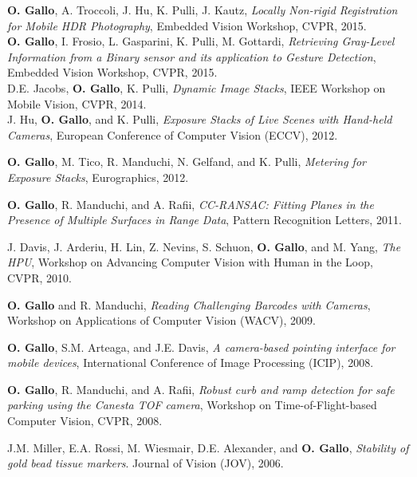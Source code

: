 \documentclass[10pt]{article}
\newcommand{\OG}{\textbf{O. Gallo}}
\begin{document}
\OG{}, A. Troccoli, J. Hu, K. Pulli, J. Kautz, \emph{Locally Non-rigid Registration for Mobile {HDR} Photography}, Embedded Vision Workshop, CVPR, 2015.\\

\OG{}, I. Frosio, L. Gasparini, K. Pulli, M. Gottardi, \emph{Retrieving Gray-Level Information from a Binary sensor and its application to Gesture Detection}, Embedded Vision Workshop, CVPR, 2015.\\

D.E. Jacobs, \OG{}, K. Pulli, \emph{Dynamic Image Stacks},  IEEE Workshop on Mobile Vision, CVPR, 2014.\\

J. Hu, \OG{}, and K. Pulli, \emph{Exposure Stacks of Live Scenes with Hand-held Cameras}, European Conference of Computer Vision (ECCV), 2012.\newline

\OG{}, M. Tico, R. Manduchi, N. Gelfand, and K. Pulli, \emph{Metering for Exposure Stacks}, Eurographics, 2012.\newline

\OG{}, R. Manduchi, and A. Rafii, \emph{CC-RANSAC: Fitting Planes in the Presence of Multiple Surfaces in Range Data}, Pattern Recognition Letters, 2011.\newline

J. Davis, J. Arderiu, H. Lin, Z. Nevins, S. Schuon, \OG{}, and M. Yang, \emph{The HPU}, Workshop on Advancing Computer Vision with Human in the Loop, CVPR, 2010.\newline

\OG{} and R. Manduchi, \emph{Reading Challenging Barcodes with Cameras}, Workshop on Applications of Computer Vision (WACV), 2009.\newline

\OG{}, S.M. Arteaga, and J.E. Davis, \emph{A camera-based pointing
interface for mobile devices}, International Conference of Image Processing (ICIP), 2008.\newline

\OG{}, R. Manduchi, and A. Rafii, \emph{Robust curb and ramp detection for
safe parking using the Canesta TOF camera},  Workshop on Time-of-Flight-based Computer Vision, CVPR, 2008.\newline

J.M. Miller, E.A. Rossi, M. Wiesmair, D.E. Alexander, and \OG{},\label{paper:GBTM}
\emph{Stability of gold bead tissue markers}. Journal of Vision (JOV), 2006.\newline
\end{document}

